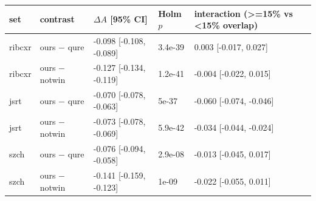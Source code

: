 \begin{tabular}{lllll}
\toprule
set & contrast & $\Delta A$ [95\% CI] & Holm $p$ & interaction (>=15\% vs <15\% overlap) \\
\midrule
ribcxr & ours $-$ qure & -0.098 [-0.108, -0.089] & 3.4e-39 & 0.003 [-0.017, 0.027] \\
ribcxr & ours $-$ notwin & -0.127 [-0.134, -0.119] & 1.2e-41 & -0.004 [-0.022, 0.015] \\
jsrt & ours $-$ qure & -0.070 [-0.078, -0.063] & 5e-37 & -0.060 [-0.074, -0.046] \\
jsrt & ours $-$ notwin & -0.073 [-0.078, -0.069] & 5.9e-42 & -0.034 [-0.044, -0.024] \\
szch & ours $-$ qure & -0.076 [-0.094, -0.058] & 2.9e-08 & -0.013 [-0.045, 0.017] \\
szch & ours $-$ notwin & -0.141 [-0.159, -0.123] & 1e-09 & -0.022 [-0.055, 0.011] \\
\bottomrule
\end{tabular}
